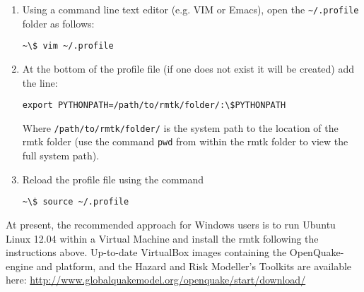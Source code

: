 \begin{enumerate}
\item Using a command line text editor (e.g. VIM or Emacs), open the \verb=~/.profile= folder as follows:

\begin{Verbatim}[frame=single, commandchars=\\\{\}, fontsize=\scriptsize]
~\$ vim ~/.profile
\end{Verbatim}

\item At the bottom of the profile file (if one does not exist it will be created) add the line:

\begin{Verbatim}[frame=single, commandchars=\\\{\}, fontsize=\scriptsize]
export PYTHONPATH=/path/to/rmtk/folder/:\$PYTHONPATH
\end{Verbatim}

Where \verb=/path/to/rmtk/folder/= is the system path to the location of the rmtk folder (use the command \verb=pwd= from within the rmtk folder to view the full system path).

\item Reload the profile file using the command

\begin{Verbatim}[frame=single, commandchars=\\\{\}, fontsize=\scriptsize]
~\$ source ~/.profile
\end{Verbatim}

\end{enumerate}

At present, the recommended approach for Windows users is to run Ubuntu Linux 12.04 within a Virtual Machine and install the rmtk following the instructions above. Up-to-date VirtualBox images containing the OpenQuake-engine and platform, and the Hazard and Risk Modeller's Toolkits are available here: \href{http://www.globalquakemodel.org/openquake/start/download/}{http://www.globalquakemodel.org/openquake/start/download/}